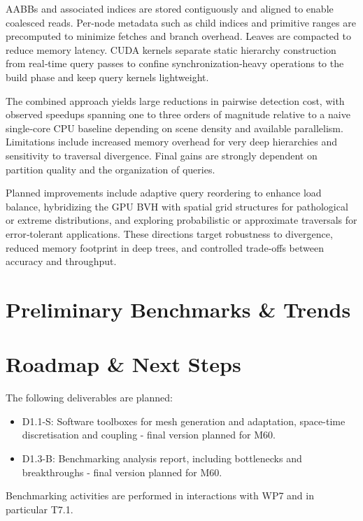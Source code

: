 AABBs and associated indices are stored contiguously and aligned to enable coalesced reads. Per‑node metadata such as child indices and primitive ranges are precomputed to minimize fetches and branch overhead. Leaves are compacted to reduce memory latency. CUDA kernels separate static hierarchy construction from real‑time query passes to confine synchronization‑heavy operations to the build phase and keep query kernels lightweight.  

The combined approach yields large reductions in pairwise detection cost, with observed speedups spanning one to three orders of magnitude relative to a naive single‑core CPU baseline depending on scene density and available parallelism. Limitations include increased memory overhead for very deep hierarchies and sensitivity to traversal divergence. Final gains are strongly dependent on partition quality and the organization of queries.  

Planned improvements include adaptive query reordering to enhance load balance, hybridizing the GPU BVH with spatial grid structures for pathological or extreme distributions, and exploring probabilistic or approximate traversals for error‑tolerant applications. These directions target robustness to divergence, reduced memory footprint in deep trees, and controlled trade‑offs between accuracy and throughput.



\section{Preliminary Benchmarks \& Trends}







\section{Roadmap \& Next Steps}

The following deliverables are planned:
\begin{itemize}
    \item D1.1-S: Software toolboxes for mesh generation and adaptation, space-time discretisation and coupling - final version planned for M60.
    \item D1.3-B: Benchmarking analysis report, including bottlenecks and breakthroughs - final version planned for M60.
\end{itemize}
Benchmarking activities are performed in interactions with WP7 and in particular T7.1.

